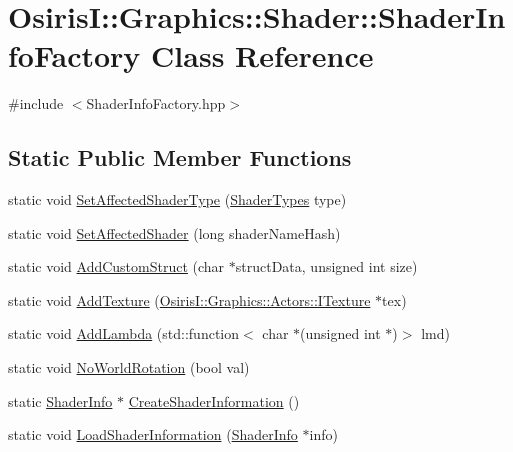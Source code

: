 \hypertarget{class_osiris_i_1_1_graphics_1_1_shader_1_1_shader_info_factory}{\section{Osiris\-I\-:\-:Graphics\-:\-:Shader\-:\-:Shader\-Info\-Factory Class Reference}
\label{class_osiris_i_1_1_graphics_1_1_shader_1_1_shader_info_factory}
}


{\ttfamily \#include $<$Shader\-Info\-Factory.\-hpp$>$}

\subsection*{Static Public Member Functions}
\begin{DoxyCompactItemize}
\item 
static void \hyperlink{class_osiris_i_1_1_graphics_1_1_shader_1_1_shader_info_factory_af42e4f7c18733b37b027703abd54ff18}{Set\-Affected\-Shader\-Type} (\hyperlink{namespace_osiris_i_1_1_graphics_1_1_shader_a337cc6333eff5c701288da2fb4fd9cec}{Shader\-Types} type)
\item 
static void \hyperlink{class_osiris_i_1_1_graphics_1_1_shader_1_1_shader_info_factory_a47c405380a56dd9be3acce5b5985d3c9}{Set\-Affected\-Shader} (long shader\-Name\-Hash)
\item 
static void \hyperlink{class_osiris_i_1_1_graphics_1_1_shader_1_1_shader_info_factory_a117029ceb9074dd919b85691441e675a}{Add\-Custom\-Struct} (char $\ast$struct\-Data, unsigned int size)
\item 
static void \hyperlink{class_osiris_i_1_1_graphics_1_1_shader_1_1_shader_info_factory_acb0c7658c6ba012d922bb8dde531b901}{Add\-Texture} (\hyperlink{class_osiris_i_1_1_graphics_1_1_actors_1_1_i_texture}{Osiris\-I\-::\-Graphics\-::\-Actors\-::\-I\-Texture} $\ast$tex)
\item 
static void \hyperlink{class_osiris_i_1_1_graphics_1_1_shader_1_1_shader_info_factory_af9a36942f8d7b9012be8817b2acd0a7e}{Add\-Lambda} (std\-::function$<$ char $\ast$(unsigned int $\ast$)$>$ lmd)
\item 
static void \hyperlink{class_osiris_i_1_1_graphics_1_1_shader_1_1_shader_info_factory_ab1c7e5f7e0b5a9e8e78cd60681a83ad3}{No\-World\-Rotation} (bool val)
\item 
static \hyperlink{struct_osiris_i_1_1_graphics_1_1_shader_1_1_shader_info}{Shader\-Info} $\ast$ \hyperlink{class_osiris_i_1_1_graphics_1_1_shader_1_1_shader_info_factory_a5616650bc010cc71dff98bef3766cc7b}{Create\-Shader\-Information} ()
\item 
static void \hyperlink{class_osiris_i_1_1_graphics_1_1_shader_1_1_shader_info_factory_ac14db9f8fd87106cba8b70c773ccc6eb}{Load\-Shader\-Information} (\hyperlink{struct_osiris_i_1_1_graphics_1_1_shader_1_1_shader_info}{Shader\-Info} $\ast$info)
\end{DoxyCompactItemize}
